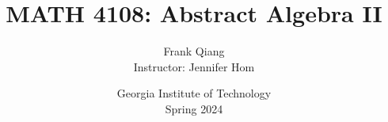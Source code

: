 \documentclass[12pt, letterpaper, oneside]{book}
\title{MATH 4108: Abstract Algebra II}
\author{Frank Qiang\\Instructor: Jennifer Hom}
\date{Georgia Institute of Technology\\Spring 2024}
\theoremstyle{definition}
\begin{document}
  \maketitle

  \begingroup
  \let\cleardoublepage\clearpage
  \tableofcontents
  \endgroup

  
  
\end{document}
